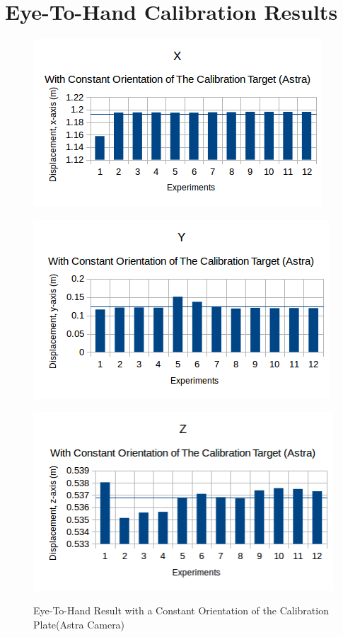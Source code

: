 \appendix
\chapter*{Eye-To-Hand Calibration Results}
\label{chap:results}


\begin{figure}[htp]
\begin{center}
{
  \includegraphics[clip,width=0.5\columnwidth]{figures/constantorientation_astra_x.png}%
}
\end{center}
\begin{center}
{
  \includegraphics[clip,width=0.5\columnwidth]{figures/constantorientation_astra_y.png}%
}
\end{center}

\begin{center}
{
  \includegraphics[clip,width=0.5\columnwidth]{figures/constantorientation_astra_z.png}%
}
\end{center}
\caption{Eye-To-Hand Result with a Constant Orientation of the Calibration Plate(Astra Camera)}
\end{figure}

